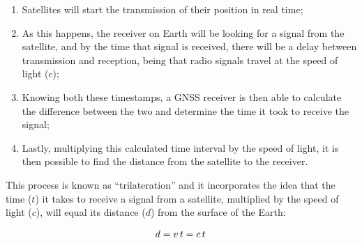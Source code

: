\begin{enumerate}
    \item Satellites will start the transmission of their position in real time;
    \item As this happens, the receiver on Earth will be looking for a signal from the satellite, and by the time that signal is received, there will be a delay between transmission and reception, being that radio signals travel at the speed of light ($c$);
    \item Knowing both these timestamps, a GNSS receiver is then able to calculate the difference between the two and determine the time it took to receive the signal;
    \item Lastly, multiplying this calculated time interval by the speed of light, it is then possible to find the distance from the satellite to the receiver.
\end{enumerate}
This process is known as ``trilateration'' and it incorporates the idea that the time ($t$) it takes to receive a signal from a satellite, multiplied by the speed of light ($c$), will equal its distance ($d$) from the surface of the Earth:

\begin{equation}\label{eq:2_1}
    d = v\,t = c\,t\,\medskip
\end{equation}

